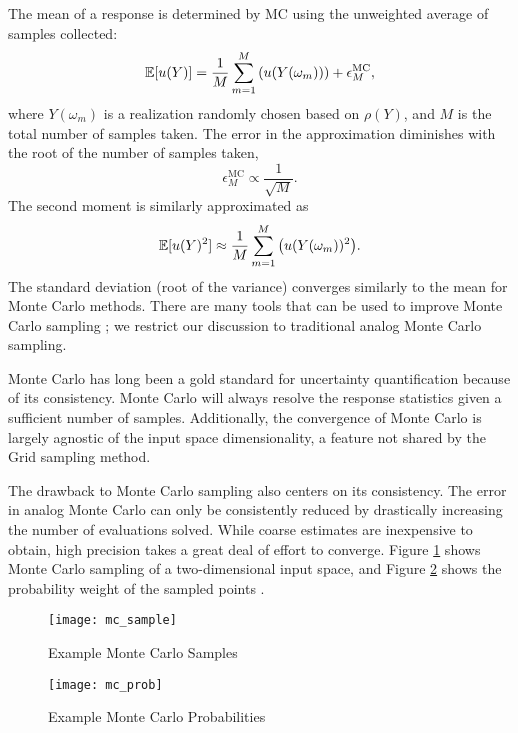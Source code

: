 The mean of a response is determined by MC using the unweighted average of samples collected:
\begin{equation}
  \mathbb{E}[ u(Y)] = \frac{1}{M}\sum_{m=1}^M \qty(u(Y(\omega_m))) + \epsilon_M^{\text{MC}},
\end{equation}
where $Y(\omega_m)$ is a realization randomly chosen based on $\rho(Y)$, and $M$ is the total number of samples taken.
The error in the approximation diminishes with the root of the number of samples taken,
\begin{equation}
  \epsilon_M^{\text{MC}} \propto \frac{1}{\sqrt{M}}.
\end{equation}
The second moment is similarly approximated as
\begin{equation}
  \mathbb{E}[ u(Y)^2] \approx \frac{1}{M}\sum_{m=1}^M \qty(u(Y(\omega_m))^2).
\end{equation}
The standard deviation (root of the variance) converges similarly to the mean for Monte Carlo methods.  There
are many tools that can be used to improve Monte Carlo sampling \cite{mcvarred}\cite{mcnpvarred}; we restrict
our discussion to traditional analog Monte Carlo sampling.

Monte Carlo has long been a gold standard for uncertainty quantification because of its consistency.  Monte
Carlo will always resolve the response statistics given a sufficient number of samples.  Additionally, the
convergence of Monte Carlo is largely agnostic of the input space dimensionality, a feature not shared by the
Grid sampling method.

The drawback to Monte Carlo sampling also centers on its consistency.  The error in analog Monte Carlo can only be
consistently reduced by drastically increasing the number of evaluations solved.  While coarse estimates are
inexpensive to obtain, high precision takes a great deal of effort to converge.
Figure \ref{fig:mc sample}
shows Monte Carlo sampling of a two-dimensional input space, and Figure \ref{fig:mc prob} shows the
probability weight of the sampled points \cite{raven}.

\begin{figure}[H]
  \centering
  \texttt{[image: mc\_sample]}
  \caption{Example Monte Carlo Samples \cite{raven}}
  \label{fig:mc sample}
\end{figure}
\begin{figure}[H]
  \centering
  \texttt{[image: mc\_prob]}
  \caption{Example Monte Carlo Probabilities \cite{raven}}
  \label{fig:mc prob}
\end{figure}

